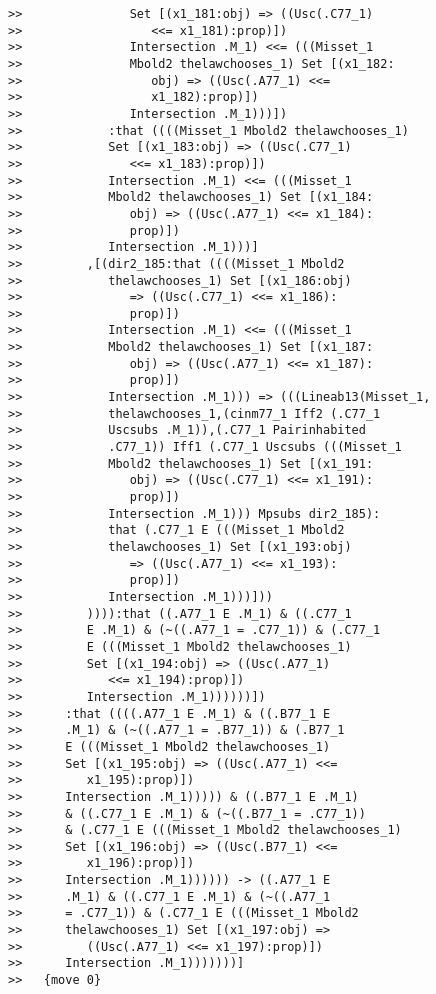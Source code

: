 \documentclass[12pt]{article}
\begin{document}
\begin{verbatim}
>>               Set [(x1_181:obj) => ((Usc(.C77_1)
>>                  <<= x1_181):prop)])
>>               Intersection .M_1) <<= (((Misset_1
>>               Mbold2 thelawchooses_1) Set [(x1_182:
>>                  obj) => ((Usc(.A77_1) <<=
>>                  x1_182):prop)])
>>               Intersection .M_1)))])
>>            :that ((((Misset_1 Mbold2 thelawchooses_1)
>>            Set [(x1_183:obj) => ((Usc(.C77_1)
>>               <<= x1_183):prop)])
>>            Intersection .M_1) <<= (((Misset_1
>>            Mbold2 thelawchooses_1) Set [(x1_184:
>>               obj) => ((Usc(.A77_1) <<= x1_184):
>>               prop)])
>>            Intersection .M_1)))]
>>         ,[(dir2_185:that ((((Misset_1 Mbold2
>>            thelawchooses_1) Set [(x1_186:obj)
>>               => ((Usc(.C77_1) <<= x1_186):
>>               prop)])
>>            Intersection .M_1) <<= (((Misset_1
>>            Mbold2 thelawchooses_1) Set [(x1_187:
>>               obj) => ((Usc(.A77_1) <<= x1_187):
>>               prop)])
>>            Intersection .M_1))) => (((Lineab13(Misset_1,
>>            thelawchooses_1,(cinm77_1 Iff2 (.C77_1
>>            Uscsubs .M_1)),(.C77_1 Pairinhabited
>>            .C77_1)) Iff1 (.C77_1 Uscsubs (((Misset_1
>>            Mbold2 thelawchooses_1) Set [(x1_191:
>>               obj) => ((Usc(.C77_1) <<= x1_191):
>>               prop)])
>>            Intersection .M_1))) Mpsubs dir2_185):
>>            that (.C77_1 E (((Misset_1 Mbold2
>>            thelawchooses_1) Set [(x1_193:obj)
>>               => ((Usc(.A77_1) <<= x1_193):
>>               prop)])
>>            Intersection .M_1)))]))
>>         )))):that ((.A77_1 E .M_1) & ((.C77_1
>>         E .M_1) & (~((.A77_1 = .C77_1)) & (.C77_1
>>         E (((Misset_1 Mbold2 thelawchooses_1)
>>         Set [(x1_194:obj) => ((Usc(.A77_1)
>>            <<= x1_194):prop)])
>>         Intersection .M_1))))))])
>>      :that ((((.A77_1 E .M_1) & ((.B77_1 E
>>      .M_1) & (~((.A77_1 = .B77_1)) & (.B77_1
>>      E (((Misset_1 Mbold2 thelawchooses_1)
>>      Set [(x1_195:obj) => ((Usc(.A77_1) <<=
>>         x1_195):prop)])
>>      Intersection .M_1))))) & ((.B77_1 E .M_1)
>>      & ((.C77_1 E .M_1) & (~((.B77_1 = .C77_1))
>>      & (.C77_1 E (((Misset_1 Mbold2 thelawchooses_1)
>>      Set [(x1_196:obj) => ((Usc(.B77_1) <<=
>>         x1_196):prop)])
>>      Intersection .M_1)))))) -> ((.A77_1 E
>>      .M_1) & ((.C77_1 E .M_1) & (~((.A77_1
>>      = .C77_1)) & (.C77_1 E (((Misset_1 Mbold2
>>      thelawchooses_1) Set [(x1_197:obj) =>
>>         ((Usc(.A77_1) <<= x1_197):prop)])
>>      Intersection .M_1)))))))]
>>   {move 0}




\end{verbatim}
\end{document}
